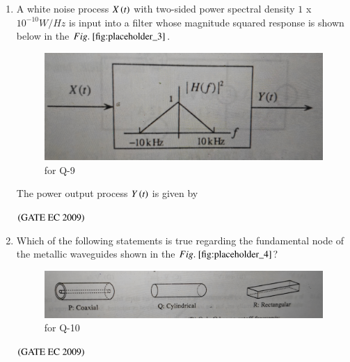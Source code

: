 \documentclass[journal,12pt,onecolumn]{IEEEtran}
\theoremstyle{remark}
\begin{document}
\begin{enumerate}[start=1, label={Q\arabic*.}]
\item A white noise process $X\left(t\right)$ with two-sided power spectral density $1$ x $10^{-10} W/Hz$ is input into a filter whose magnitude squared response is shown below in the $\figref{fig:placeholder_3}$.
\begin{figure}[H]
    \centering
    \includegraphics[width=0.5\columnwidth]{figs/fig_3.jpg}
    \caption{\centering for Q-9}
    \label{fig:placeholder_3}
\end{figure}
The power output process $Y\left(t\right)$ is given by 
\begin{enumerate}
\end{enumerate}
\hfill $\left(\text{GATE EC 2009}\right)$

\item Which of the following statements is true regarding the fundamental node of the metallic waveguides shown in the $\figref{fig:placeholder_4}$?
\begin{figure}[H]
    \centering
    \includegraphics[width=0.5\columnwidth]{figs/fig_4.jpg}
    \caption{\centering for Q-10}
    \label{fig:placeholder_4}
\end{figure}
\begin{enumerate}
\end{enumerate}
\hfill $\left(\text{GATE EC 2009}\right)$


\end{enumerate}
\end{document}
